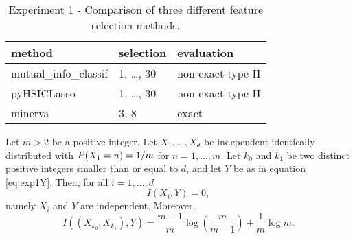 \begin{table}
	\centering
{
	\begin{tabular}{l|l|l}
		\textbf{method}
		&
		\textbf{selection}
		&
		\textbf{evaluation}
		\\
		\hline
		mutual\_info\_classif
		&
		1, \dots, 30
		&
		non-exact type II
		\\
		pyHSICLasso
		&
		1, \dots, 30
		&
		non-exact type II
		\\
		minerva
		&
		3, 8
		&
		exact
	\end{tabular}
}
\caption{Experiment 1 - Comparison of three different feature selection methods.}
\label{tab.experiment1}
\end{table}






\begin{lemma}
	\label{lemma.experiment1}
	Let $m>2$ be a positive integer. 
	Let
	$X_1, \dots, X_d$
	be independent identically distributed
	with 
	${{P}}(X_1 = n) = 1 / m$
	for $n=1, \dots, m$. 
	Let 
	$k_0$ and $k_1$ 
	be two distinct positive integers 
	smaller than or equal to $d$,
	and let $Y$
	be as in equation \eqref{eq.exp1Y}.
	Then,
	for all $i=1, \dots, d$
	\begin{equation}
		\label{eq.exp1pairwisemi}
		I(X_i, Y) = 0,
	\end{equation}
	namely $X_i$ and $Y$ are independent. 
	Moreover,
	\begin{equation}
		\label{eq.exp1mi}
		I((X_{k_0}, X_{k_1}), Y) 
		=
			\frac{m-1}{m} \log\left(\frac{m}{m-1}\right)
			+
			\frac{1}{m}\log m
			.
	\end{equation}
\end{lemma}


